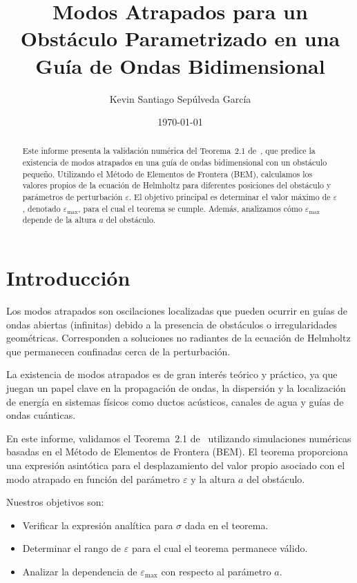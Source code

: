 \documentclass[11pt]{article}
\title{Modos Atrapados para un Obstáculo Parametrizado en una Guía de Ondas Bidimensional}
\author{Kevin Santiago Sepúlveda García}
\date{\today}
\begin{document}
\maketitle

\begin{abstract}
Este informe presenta la validación numérica del Teorema~2.1 de~\cite{Zhevandrov2025}, que predice la existencia de modos atrapados en una guía de ondas bidimensional con un obstáculo pequeño. Utilizando el Método de Elementos de Frontera (BEM), calculamos los valores propios de la ecuación de Helmholtz para diferentes posiciones del obstáculo y parámetros de perturbación $\varepsilon$. El objetivo principal es determinar el valor máximo de $\varepsilon$, denotado $\varepsilon_{\max}$, para el cual el teorema se cumple. Además, analizamos cómo $\varepsilon_{\max}$ depende de la altura $a$ del obstáculo.
\end{abstract}

\section{Introducción}

Los modos atrapados son oscilaciones localizadas que pueden ocurrir en guías de ondas abiertas (infinitas) debido a la presencia de obstáculos o irregularidades geométricas. Corresponden a soluciones no radiantes de la ecuación de Helmholtz que permanecen confinadas cerca de la perturbación.

La existencia de modos atrapados es de gran interés teórico y práctico, ya que juegan un papel clave en la propagación de ondas, la dispersión y la localización de energía en sistemas físicos como ductos acústicos, canales de agua y guías de ondas cuánticas.

En este informe, validamos el Teorema~2.1 de~\cite{Zhevandrov2025} utilizando simulaciones numéricas basadas en el Método de Elementos de Frontera (BEM). El teorema proporciona una expresión asintótica para el desplazamiento del valor propio asociado con el modo atrapado en función del parámetro $\varepsilon$ y la altura $a$ del obstáculo.

Nuestros objetivos son:
\begin{itemize}
    \item Verificar la expresión analítica para $\sigma$ dada en el teorema.
    \item Determinar el rango de $\varepsilon$ para el cual el teorema permanece válido.
    \item Analizar la dependencia de $\varepsilon_{\max}$ con respecto al parámetro $a$.
\end{itemize}
\end{document}
